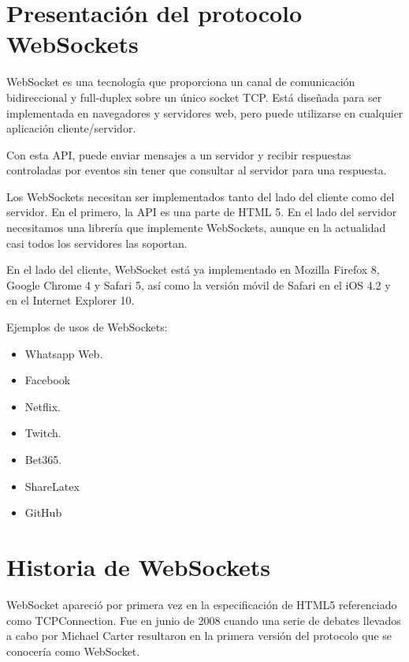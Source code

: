\documentclass[12pt,a4paper]{article}
\begin{document}
\section{Presentación del protocolo WebSockets}


WebSocket es una tecnología que proporciona un canal de comunicación bidireccional y full-duplex sobre un único socket TCP. Está diseñada para ser implementada en navegadores y servidores web, pero puede utilizarse en cualquier aplicación cliente/servidor.

​Con esta API, puede enviar mensajes a un servidor y recibir respuestas controladas por eventos sin tener que consultar al servidor para una respuesta.

​Los WebSockets necesitan ser implementados tanto del lado del cliente como del servidor. En el primero, la API es una parte de HTML 5. En el lado del servidor necesitamos una librería que implemente WebSockets, aunque en la actualidad casi todos los servidores las soportan.

​En el lado del cliente, WebSocket está ya implementado en Mozilla Firefox 8, Google Chrome 4 y Safari 5, así como la versión móvil de Safari en el iOS 4.2 y en el Internet Explorer 10.

​Ejemplos de usos de WebSockets:
\begin{itemize}
\item Whatsapp Web.
\item Facebook
\item Netflix.
\item Twitch.
\item Bet365.
\item ShareLatex
\item GitHub
\end{itemize}


\section{Historia de WebSockets}

​WebSocket apareció por primera vez en la especificación de HTML5 referenciado como TCPConnection. Fue en junio de 2008 cuando una serie de debates llevados a cabo por Michael Carter resultaron en la primera versión del protocolo que se conocería como WebSocket.
\end{document}
